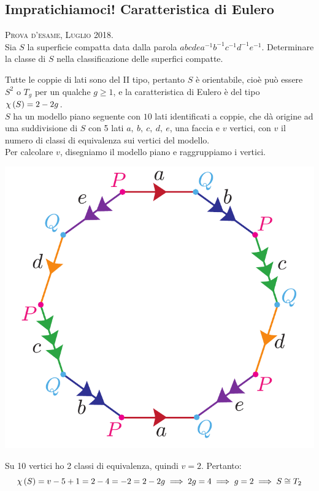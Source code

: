 \subsection{Impratichiamoci! Caratteristica di Eulero}
\begin{exercise}\textsc{Prova d'esame, Luglio 2018.}\\
Sia $S$ la superficie compatta data dalla parola $abcdea^{-1}b^{-1}c^{-1}d^{-1}e^{-1}$. Determinare la classe di $S$ nella classificazione delle superfici compatte.
\end{exercise}
\begin{solution}
	Tutte le coppie di lati sono del II tipo, pertanto $S$ è orientabile, cioè può essere $S^2$ o $T_g$ per un qualche $g\geq 1$, e la caratteristica di Eulero è del tipo $\euler{S}{\ }=2-2g$.\\
	$S$ ha un modello piano seguente con $10$ lati identificati a coppie, che dà origine ad una suddivisione di $S$ con 5 lati $a,\ b,\ c,\ d,\ e$, una faccia e $v$ vertici, con $v$ il numero di classi di equivalenza sui vertici del modello.\\
	Per calcolare $v$, disegniamo il modello piano e raggruppiamo i vertici.
	\begin{center}
		\includegraphics[trim=0cm 0cm 0cm 0cm, clip, scale=0.375]{images/modellopianoexercise.pdf}
	\end{center}
Su 10 vertici ho 2 classi di equivalenza, quindi $v=2$. Pertanto:
\begin{equation*}
	\euler{S}{\ }=v-5+1=2-4=-2=2-2g\implies 2g=4\implies g=2\implies S\cong T_2
\end{equation*}
\vspace{-6mm}
\end{solution}